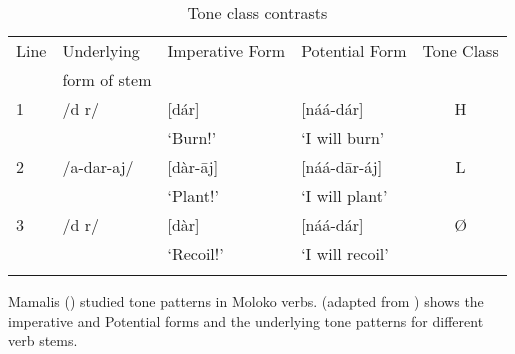 \begin{table}
\begin{tabular}{llllc}
\lsptoprule
{Line} & {Underlying } & {Imperative Form} & {Potential Form} & {Tone Class}\\
& {form of stem}\\\midrule
{1} & /d r/ & [dár] & [náá-dár] & {H}\\

& & ‘Burn!’ & ‘I will burn’ \\
{2} & /a-dar-aj/ & [dàr-\={a}j] & [náá-d\={a}r-áj] & {L}\\

& & ‘Plant!’ &  ‘I will plant’ & \\
{3} & /d r/ & [dàr] & [náá-dár] & Ø\\

& & ‘Recoil!’ & ‘I will recoil’ \\
\lspbottomrule
\end{tabular}
\caption{Tone class contrasts \label{tab:44}}
\end{table}

Mamalis (\citealt{FriesenMamalis2008}) studied tone patterns in Moloko verbs.  (adapted from \citealt{FriesenMamalis2008}) shows the imperative and Potential forms and the underlying tone patterns for different verb stems. 

